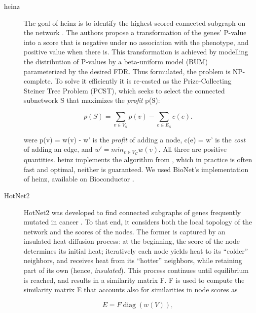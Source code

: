 \documentclass[twocolumn, 10pt]{article}
\begin{document}
\begin{description}
\item[{heinz}] The goal of heinz is to identify the highest-scored connected subgraph on the network \cite{dittrich_identifying_2008}. The authors propose a transformation of the genes' P-value into a score that is negative under no association with the phenotype, and positive value when there is. This transformation is achieved by modelling the distribution of P-values by a beta-uniform model (BUM) parameterized by the desired FDR. Thus formulated, the problem is NP-complete. To solve it efficiently it is re-casted as the Prize-Collecting Steiner Tree Problem (PCST), which seeks to select the connected subnetwork S that maximizes the \emph{profit} p(S):

\begin{equation*}
p(S) = \sum_{v \in V_S} p(v) - \sum_{e \in E_S} c(e). 
\end{equation*}

were p(v) = w(v) - w' is the \emph{profit} of adding a node, c(e) = w' is the \emph{cost} of adding an edge, and $w' = min_{v \in V_{G}} w(v)$. All three are positive quantities. heinz implements the algorithm from \citet{ljubic_algorithmic_2006}, which in practice is often fast and optimal, neither is guaranteed. We used BioNet's implementation of heinz, available on Bioconductor \cite{beisser_bionet:_2010,heinz}.

\item[{HotNet2}] HotNet2 was developed to find connected subgraphs of genes frequently mutated in cancer \cite{leiserson_pan-cancer_2015}. To that end, it considers both the local topology of the network and the scores of the nodes. The former is captured by an insulated heat diffusion process: at the beginning, the score of the node determines its initial heat; iteratively each node yields heat to its ``colder'' neighbors, and receives heat from its ``hotter'' neighbors, while retaining part of its own (hence, \emph{insulated}). This process continues until equilibrium is reached, and results in a similarity matrix F. F is used to compute the similarity matrix E that accounts also for similarities in node scores as 

\begin{equation*} 
E = F \operatorname{diag}(w(V)), 
\end{equation*}


\end{description}
\end{document}
